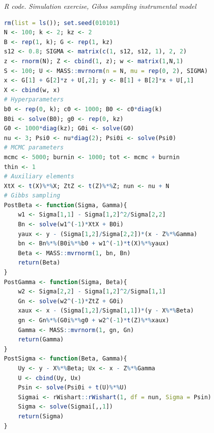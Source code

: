 \begin{enumerate}[leftmargin=*]
\begin{tcolorbox}[enhanced,width=4.67in,center upper,
	fontupper=\large\bfseries,drop shadow southwest,sharp corners]
	\textit{R code. Simulation exercise, Gibss sampling instrumental model}
	\begin{VF}
		\begin{lstlisting}[language=R]
rm(list = ls()); set.seed(010101)
N <- 100; k <- 2; kz <- 2
B <- rep(1, k); G <- rep(1, kz)
s12 <- 0.8; SIGMA <- matrix(c(1, s12, s12, 1), 2, 2)
z <- rnorm(N); Z <- cbind(1, z); w <- matrix(1,N,1)
S <- 100; U <- MASS::mvrnorm(n = N, mu = rep(0, 2), SIGMA)
x <- G[1] + G[2]*z + U[,2]; y <- B[1] + B[2]*x + U[,1]
X <- cbind(w, x)
# Hyperparameters
b0 <- rep(0, k); c0 <- 1000; B0 <- c0*diag(k)
B0i <- solve(B0); g0 <- rep(0, kz)
G0 <- 1000*diag(kz); G0i <- solve(G0)
nu <- 3; Psi0 <- nu*diag(2); Psi0i <- solve(Psi0)
# MCMC parameters
mcmc <- 5000; burnin <- 1000; tot <- mcmc + burnin
thin <- 1
# Auxiliary elements
XtX <- t(X)%*%X; ZtZ <- t(Z)%*%Z; nun <- nu + N
# Gibbs sampling
PostBeta <- function(Sigma, Gamma){
	w1 <- Sigma[1,1] - Sigma[1,2]^2/Sigma[2,2]
	Bn <- solve(w1^(-1)*XtX + B0i)
	yaux <- y - (Sigma[1,2]/Sigma[2,2])*(x - Z%*%Gamma)
	bn <- Bn%*%(B0i%*%b0 + w1^(-1)*t(X)%*%yaux)
	Beta <- MASS::mvrnorm(1, bn, Bn)
	return(Beta)
}
PostGamma <- function(Sigma, Beta){
	w2 <- Sigma[2,2] - Sigma[1,2]^2/Sigma[1,1]
	Gn <- solve(w2^(-1)*ZtZ + G0i)
	xaux <- x - (Sigma[1,2]/Sigma[1,1])*(y - X%*%Beta)
	gn <- Gn%*%(G0i%*%g0 + w2^(-1)*t(Z)%*%xaux)
	Gamma <- MASS::mvrnorm(1, gn, Gn)
	return(Gamma)
}
PostSigma <- function(Beta, Gamma){
	Uy <- y - X%*%Beta; Ux <- x - Z%*%Gamma
	U <- cbind(Uy, Ux)
	Psin <- solve(Psi0i + t(U)%*%U)
	Sigmai <- rWishart::rWishart(1, df = nun, Sigma = Psin)
	Sigma <- solve(Sigmai[,,1]) 
	return(Sigma)
}
\end{lstlisting}
	\end{VF}
\end{tcolorbox}


\end{enumerate}

